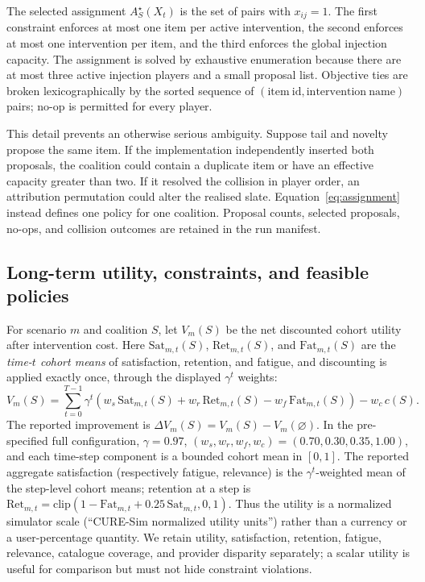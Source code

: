 \documentclass[review]{elsarticle}
\theoremstyle{plain}
\theoremstyle{definition}
\theoremstyle{remark}
\newcommand{\Utility}{V}
\begin{document}
The selected assignment $A_S^{\star}(X_t)$ is the set of pairs with $x_{ij}=1$. The first constraint enforces at most one item per active intervention, the second enforces at most one intervention per item, and the third enforces the global injection capacity. The assignment is solved by exhaustive enumeration because there are at most three active injection players and a small proposal list. Objective ties are broken lexicographically by the sorted sequence of $(\mathrm{item\ id},\mathrm{intervention\ name})$ pairs; no-op is permitted for every player.

This detail prevents an otherwise serious ambiguity. Suppose tail and novelty propose the same item. If the implementation independently inserted both proposals, the coalition could contain a duplicate item or have an effective capacity greater than two. If it resolved the collision in player order, an attribution permutation could alter the realised slate. Equation~\eqref{eq:assignment} instead defines one policy for one coalition. Proposal counts, selected proposals, no-ops, and collision outcomes are retained in the run manifest.

\subsection{Long-term utility, constraints, and feasible policies}

For scenario $m$ and coalition $S$, let $\Utility_m(S)$ be the net discounted cohort utility after intervention cost. Here $\mathrm{Sat}_{m,t}(S)$, $\mathrm{Ret}_{m,t}(S)$, and $\mathrm{Fat}_{m,t}(S)$ are the \emph{time-$t$ cohort means} of satisfaction, retention, and fatigue, and discounting is applied exactly once, through the displayed $\gamma^t$ weights:
\begin{equation}
 \Utility_m(S)=\sum_{t=0}^{T-1}\gamma^t\left(w_s\,\mathrm{Sat}_{m,t}(S)+w_r\,\mathrm{Ret}_{m,t}(S)-w_f\,\mathrm{Fat}_{m,t}(S)\right)-w_c\,c(S).
\label{eq:utility}
\end{equation}
The reported improvement is $\Delta\Utility_m(S)=\Utility_m(S)-\Utility_m(\varnothing)$. In the pre-specified full configuration, $\gamma=0.97$, $(w_s,w_r,w_f,w_c)=(0.70,0.30,0.35,1.00)$, and each time-step component is a bounded cohort mean in $[0,1]$. The reported aggregate satisfaction (respectively fatigue, relevance) is the $\gamma^t$-weighted mean of the step-level cohort means; retention at a step is $\mathrm{Ret}_{m,t}=\mathrm{clip}(1-\mathrm{Fat}_{m,t}+0.25\,\mathrm{Sat}_{m,t},0,1)$. Thus the utility is a normalized simulator scale (``CURE-Sim normalized utility units'') rather than a currency or a user-percentage quantity. We retain utility, satisfaction, retention, fatigue, relevance, catalogue coverage, and provider disparity separately; a scalar utility is useful for comparison but must not hide constraint violations.
\end{document}
